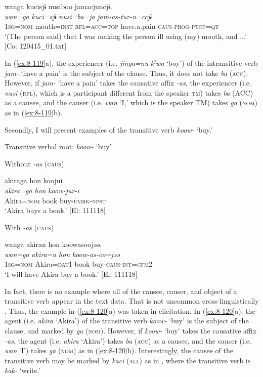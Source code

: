   {\TM}
\glll  wanga  kucisjɨ  nusiboo  jamacjuncjɨ.\\
\textit{wan=ga}  \textit{kuci=sjɨ}  \textit{nusi=ba=ja}  \textit{jam-as-tur-n=ccjɨ}\\
    1\textsc{sg}=\textsc{nom}  mouth=\textsc{inst}  \textsc{rfl}=\textsc{acc}=\textsc{top}  have.a.pain-\textsc{caus}-\textsc{prog}-\textsc{ptcp}=\textsc{qt}\\
\glt ‘(The person\textit{\textsubscript{} }said) that I was making the person ill using (my) mouth, and ...’ [Co: 120415\_01.txt]
\z
\z

In (\ref{ex:8-119}a), the experiencer (i.e. \textit{jinga=nu} \textit{kˀwa} ‘boy’) of the intransitive verb \textit{jam-} ‘have a pain’ is the subject of the clause. Thus, it does not take \textit{ba} (\textsc{acc}). However, if \textit{jam-} ‘have a pain’ takes the causative affix \textit{-as}, the experiencer (i.e. \textit{nusi} (\textsc{rfl}), which is a participant different from the speaker \textsc{tm}) takes \textit{ba} (ACC) as a causee, and the causer (i.e. \textit{wan} ‘I,’ which is the speaker TM) takes \textit{ga} (\textsc{nom}) as in (\ref{ex:8-119}b).

  Secondly, I will present examples of the transitive verb \textit{koow-} ‘buy.’

\ea\label{ex:8-120}
  Transitive verbal root: \textit{koow-} ‘buy’

\ea Without \textit{-as} (\textsc{caus})

  {\TM}
\glll  akiraga  {\textbar}hon{\textbar}  koojui\\
\textit{akira=ga}  \textit{hon}  \textit{koow-jur-i}\\
    Akira=\textsc{nom}  book  buy-\textsc{umrk}-\textsc{npst}\\
\glt ‘Akira buys a book.’ [El: 111118]


\ex With \textit{-as} (\textsc{caus})

  {\TM}
\glll  wanga  akiran  {\textbar}hon{\textbar}  koowasoojəə.\\
\textit{wan=ga}  \textit{akira=n}  \textit{hon}  \textit{koow-as-oo=jəə}\\
    1\textsc{sg}=\textsc{nom}  Akira=\textsc{dat1}  book  buy-\textsc{caus}-\textsc{int}=\textsc{cfm2}\\
\glt ‘I will have Akira buy a book.’ [El: 111118]
\z
\z

In fact, there is no example where all of the causee, causer, and object of a transitive verb appear in the text data. That is not uncommon cross-linguistically \citep[79]{Dryer2007}. Thus, the example in (\ref{ex:8-120}a) was taken in elicitation. In (\ref{ex:8-120}a), the agent (i.e. \textit{akira} ‘Akira’) of the transitive verb \textit{koow-} ‘buy’ is the subject of the clause, and marked by \textit{ga} (\textsc{nom}). However, if \textit{koow-} ‘buy’ takes the causative affix \textit{-as}, the agent (i.e. \textit{akira} ‘Akira’) takes \textit{ba} (\textsc{acc}) as a causee, and the causer (i.e. \textit{wan} ‘I’) takes \textit{ga} (\textsc{nom}) as in (\ref{ex:8-120}b). Interestingly, the causee of the transitive verb may be marked by \textit{kaci} (\textsc{all}) as in , where the transitive verb is \textit{kak-} ‘write.’

